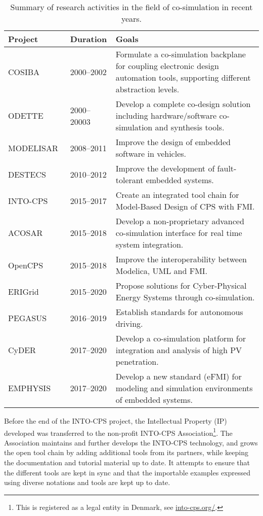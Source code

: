 \begin{table}[htb]
  \scriptsize
  \caption{Summary of research activities in the field of co-simulation in recent years. }
  \label{tab:projects}
  \begin{tabular}{llp{}}
  \textbf{Project} & \textbf{Duration} & \textbf{Goals} \\ \hline
  COSIBA~\cite{cosibas} & 2000--2002 &  Formulate a co-simulation backplane for coupling electronic design automation tools,  supporting different abstraction levels. \\
  ODETTE~\cite{odette} & 2000--20003 &  Develop a complete co-design solution including hardware/software co-simulation and synthesis tools. \\
  MODELISAR~\cite{modelisar} & 2008--2011 &  Improve the design of embedded software in vehicles. \\
  DESTECS~\cite{destecs} & 2010--2012 &  Improve the development of fault-tolerant embedded systems. \\
  INTO-CPS~\cite{intocps} & 2015--2017 &  Create an integrated tool chain for Model-Based Design of CPS with FMI.  \\
  ACOSAR~\cite{acosar} & 2015--2018 &  Develop a non-proprietary advanced co-simulation interface for real time system integration.  \\
  OpenCPS~\cite{opencps} & 2015--2018 &  Improve the interoperability between Modelica, UML and FMI.  \\
  ERIGrid~\cite{erigrid} & 2015--2020 &  Propose solutions for Cyber-Physical Energy Systems through co-simulation.  \\
  PEGASUS~\cite{pegasus} & 2016--2019 &  Establish standards for autonomous driving. \\
  CyDER~\cite{cyder} & 2017--2020 &  Develop a co-simulation platform for integration and analysis of high PV penetration. \\
  EMPHYSIS~\cite{emphysis} & 2017--2020 &  Develop a new standard (eFMI) for modeling and simulation environments of embedded systems.  \\ 
  \hline
  \end{tabular}%
\end{table}


Before the end of the INTO-CPS project, the Intellectual Property (IP) developed was transferred to the non-profit INTO-CPS Association\footnote{This is registered as a legal entity in Denmark, see \url{into-cps.org/}.}. The Association maintains and further develops the INTO-CPS technology, and grows the open tool chain by adding additional tools from its partners, while keeping the documentation and tutorial material up to date. It attempts to ensure that the different tools are kept in sync and that the importable examples expressed using diverse notations and tools are kept up to date.

